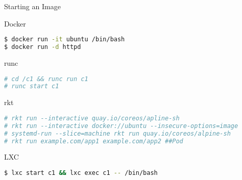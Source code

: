 \begin{frame}[fragile]{Starting an Image}

\begin{block}{Docker}
\begin{lstlisting}[language=bash,keywordstyle=\bf,stringstyle=\it,basicstyle=\tiny]
$ docker run -it ubuntu /bin/bash
$ docker run -d httpd
\end{lstlisting}
\end{block}

\begin{block}{runc}
\begin{lstlisting}[language=bash,keywordstyle=\bf,stringstyle=\it,basicstyle=\tiny]
# cd /c1 && runc run c1
# runc start c1
\end{lstlisting}
\end{block}



\begin{block}{rkt}
\begin{lstlisting}[language=bash,keywordstyle=\bf,stringstyle=\it,basicstyle=\tiny]
# rkt run --interactive quay.io/coreos/apline-sh
# rkt run --interactive docker://ubuntu --insecure-options=image
# systemd-run --slice=machine rkt run quay.io/coreos/alpine-sh
# rkt run example.com/app1 example.com/app2 ##Pod
\end{lstlisting}
\end{block}

\begin{block}{LXC}
\begin{lstlisting}[language=bash,keywordstyle=\bf,stringstyle=\it,basicstyle=\tiny]
$ lxc start c1 && lxc exec c1 -- /bin/bash
\end{lstlisting}
\end{block}

\end{frame}
